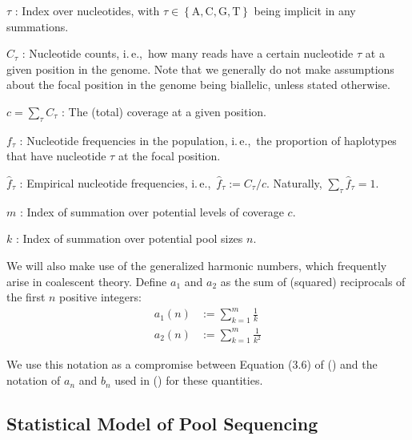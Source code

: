 \documentclass[a4paper,fontsize=9pt,DIV=14]{scrartcl}
\newcommand\citeay[1]{\citeauthor{#1} (\citeyear{#1}) \cite{#1}}
\newcommand{\samplesize}{n}
\newcommand{\coverage}{c}
\newcommand{\empfreq}{\widehat{f}}
\newcommand{\ie}{i.\,e.,~}
\begin{document}
$\tau$ :
Index over nucleotides, with $\tau \in \left\{ \text{A}, \text{C}, \text{G}, \text{T} \right\}$ being implicit in any summations.

$C_\tau$ :
Nucleotide counts, \ie how many reads have a certain nucleotide $\tau$ at a given position in the genome. Note that we generally do not make assumptions about the focal position in the genome being biallelic, unless stated otherwise.

$\coverage = \sum_\tau C_\tau$ : The (total) coverage at a given position.

$f_\tau$ :
Nucleotide frequencies in the population, \ie the proportion of haplotypes that have nucleotide $\tau$ at the focal position.

$\empfreq_\tau$ :
Empirical nucleotide frequencies, \ie $\empfreq_\tau := C_\tau / \coverage$. Naturally, $\sum_\tau \empfreq_\tau = 1$.


$m$ :
Index of summation over potential levels of coverage $\coverage$.

$k$ :
Index of summation over potential pool sizes $\samplesize$.




We will also make use of the generalized harmonic numbers, which frequently arise in coalescent theory.  Define $a_1$ and $a_2$ as the sum of (squared) reciprocals of the first $n$ positive integers:
%
\begin{align}
    \label{eq:an}
    a_1(n) &:= \sum_{k=1}^{m} \frac{1}{k}
    \\
    \label{eq:bn}
    a_2(n) &:= \sum_{k=1}^{m} \frac{1}{k^2}
\end{align}
%


We use this notation as a compromise between Equation (3.6) of \citeay{Hahn2018} and the notation of $a_n$ and $b_n$ used in \citeay{Achaz2008} for these quantities.

\subsection{Statistical Model of Pool Sequencing}
\label{supp:sec:model}
\end{document}
